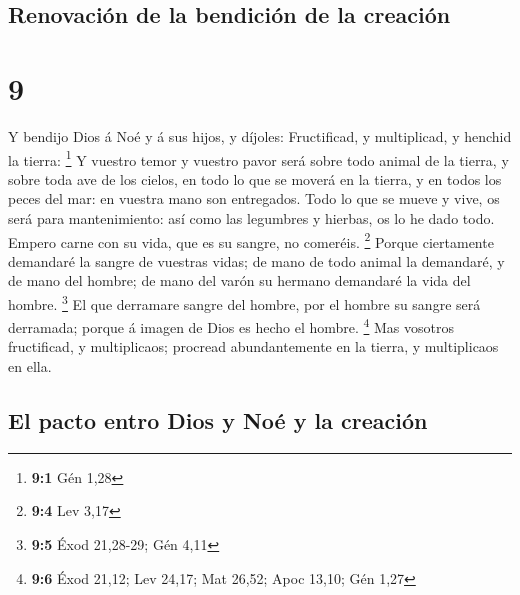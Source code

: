 \hypertarget{renovaciuxf3n-de-la-bendiciuxf3n-de-la-creaciuxf3n}{%
\subsection{Renovación de la bendición de la
creación}\label{renovaciuxf3n-de-la-bendiciuxf3n-de-la-creaciuxf3n}}

\hypertarget{section-8}{%
\section{9}\label{section-8}}

 Y bendijo Dios á Noé y á sus hijos, y díjoles:
Fructificad, y multiplicad, y henchid la tierra: \footnote{\textbf{9:1}
  Gén 1,28}  Y vuestro temor y vuestro pavor será sobre
todo animal de la tierra, y sobre toda ave de los cielos, en todo lo que
se moverá en la tierra, y en todos los peces del mar: en vuestra mano
son entregados.  Todo lo que se mueve y vive, os será para
mantenimiento: así como las legumbres y hierbas, os lo he dado todo.
 Empero carne con su vida, que es su sangre, no comeréis.
\footnote{\textbf{9:4} Lev 3,17}  Porque ciertamente
demandaré la sangre de vuestras vidas; de mano de todo animal la
demandaré, y de mano del hombre; de mano del varón su hermano demandaré
la vida del hombre. \footnote{\textbf{9:5} Éxod 21,28-29; Gén 4,11}
 El que derramare sangre del hombre, por el hombre su
sangre será derramada; porque á imagen de Dios es hecho el hombre.
\footnote{\textbf{9:6} Éxod 21,12; Lev 24,17; Mat 26,52; Apoc 13,10; Gén
  1,27}  Mas vosotros fructificad, y multiplicaos;
procread abundantemente en la tierra, y multiplicaos en ella.

\hypertarget{el-pacto-entro-dios-y-nouxe9-y-la-creaciuxf3n}{%
\subsection{El pacto entro Dios y Noé y la
creación}\label{el-pacto-entro-dios-y-nouxe9-y-la-creaciuxf3n}}

